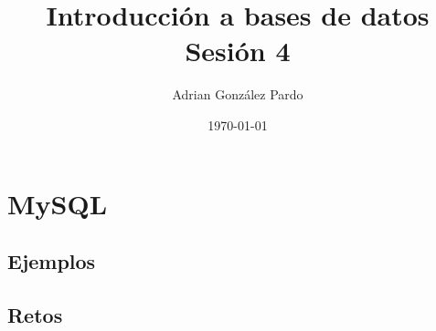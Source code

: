 \documentclass[10pt]{article}
\title{Introducción a bases de datos\\Sesión 4}
\author{Adrian González Pardo}
\date{\today}
\begin{document}
\maketitle
\section{MySQL}
\subsection{Ejemplos}
\begin{center}
  
  
  
\end{center}
\clearpage
\subsection{Retos}
\begin{center}
  
  
\end{center}
\clearpage
\end{document}
